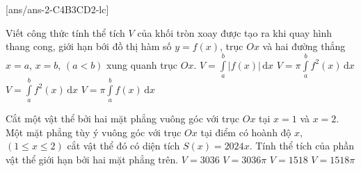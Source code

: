 {}[ans/ans-2-C4B3CD2-lc]
\begin{ex}%
Viết công thức tính thể tích $V$ của khối tròn xoay được tạo ra khi quay hình thang cong, giới hạn bới đồ thị hàm số $y=f(x)$, trục $O x$ và hai đường thẳng $x=a$, $x=b$, $(a<b)$ xung quanh trục $O x$.
\choice
{$V=\displaystyle\int\limits_a^b \left|f(x)\right| \mathrm{\,d} x$}
{\True $V=\pi \displaystyle\int\limits_a^b f^2(x) \mathrm{\,d} x $}
{$V=\displaystyle\int\limits_a^b f^2(x) \mathrm{\,d} x$}
{$V=\pi \displaystyle\int\limits_a^b f(x) \mathrm{\,d} x$}
\end{ex}
\begin{ex}%
	Cắt một vật thể bởi hai mặt phẳng vuông góc với trục $O x$ tại $x=1$ và $x=2$. Một mặt phẳng tùy ý vuông góc với trục $O x$ tại điểm có hoành độ $x$, $(1 \leq x \leq 2)$ cắt vật thể đó có diện tích $S(x)=2024 x$. Tính thể tích của phần vật thể giới hạn bởi hai mặt phẳng trên.
	\choice
	{\True $V=3036$}
	{$V=3036 \pi$}
	{$V=1518$}
	{$V=1518 \pi$}
\end{ex}

